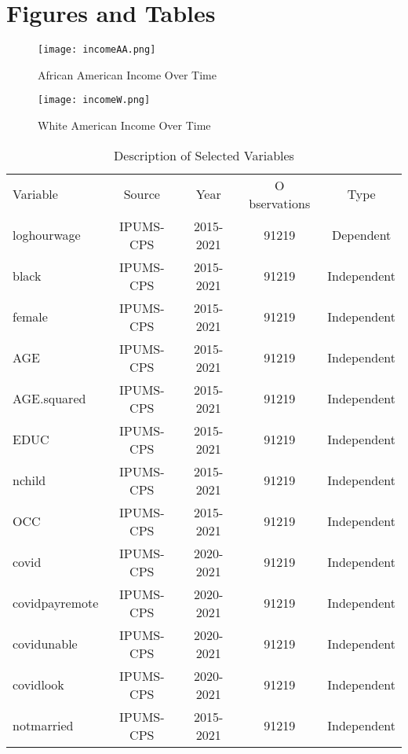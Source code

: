 \documentclass[12pt, english]{article}
\begin{document}
\section{Figures and Tables}
\begin{figure}[htp]
    \centering
    \texttt{[image: incomeAA.png]}
    \caption{African American Income Over Time}
    \label{fig:fig1}
\end{figure}
\begin{figure}[htp]
    \centering
    \texttt{[image: incomeW.png]}
    \caption{White American Income Over Time}
    \label{fig:fig2}
\end{figure}
\begin{table}[ht]
    \centering
    \begin{tabular}{lcccc}
     Variable &	Source & Year &	O
     bservations &	Type\\
loghourwage & IPUMS-CPS & 2015-2021	& 91219 & Dependent\\
black &	IPUMS-CPS & 2015-2021 & 91219 & Independent\\
female & IPUMS-CPS & 2015-2021 & 91219 & Independent\\
AGE & IPUMS-CPS & 2015-2021 & 91219 & Independent\\
AGE.squared	& IPUMS-CPS	& 2015-2021	& 91219	& Independent\\
EDUC &	IPUMS-CPS &	2015-2021 &	91219 &	Independent\\
nchild & IPUMS-CPS & 2015-2021 & 91219 & Independent\\
OCC	& IPUMS-CPS	& 2015-2021	& 91219	& Independent\\
covid & IPUMS-CPS & 2020-2021 & 91219 & Independent\\
covidpayremote & IPUMS-CPS & 2020-2021 & 91219 & Independent\\
covidunable	& IPUMS-CPS	& 2020-2021	& 91219	& Independent\\
covidlook & IPUMS-CPS & 2020-2021 & 91219 & Independent\\
notmarried & IPUMS-CPS & 2015-2021 & 91219 & Independent\\
    \end{tabular}
    \caption{Description of Selected Variables}
    \label{tab:variables}
\end{table}

\end{document}
